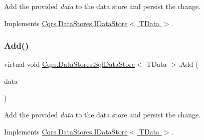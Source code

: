 Add the provided {\itshape data}  to the data store and persist the change. 



Implements \hyperlink{interfaceCqrs_1_1DataStores_1_1IDataStore_a114404daaf37fec9cc5547cd9a17858c_a114404daaf37fec9cc5547cd9a17858c}{Cqrs.\+Data\+Stores.\+I\+Data\+Store$<$ T\+Data $>$}.

\mbox{\label{classCqrs_1_1DataStores_1_1SqlDataStore_a45aa105f2571510223c6073804690487_a45aa105f2571510223c6073804690487}} 
\subsubsection{\texorpdfstring{Add()}{Add()}\hspace{0.1cm}{\footnotesize\ttfamily [2/2]}}
{\footnotesize\ttfamily virtual void \hyperlink{classCqrs_1_1DataStores_1_1SqlDataStore}{Cqrs.\+Data\+Stores.\+Sql\+Data\+Store}$<$ T\+Data $>$.Add (\begin{DoxyParamCaption}\item[{I\+Enumerable$<$ T\+Data $>$}]{data }\end{DoxyParamCaption})\hspace{0.3cm}{\ttfamily [virtual]}}



Add the provided {\itshape data}  to the data store and persist the change. 



Implements \hyperlink{interfaceCqrs_1_1DataStores_1_1IDataStore_a906f3f2f80db7a549a4170eca4653e26_a906f3f2f80db7a549a4170eca4653e26}{Cqrs.\+Data\+Stores.\+I\+Data\+Store$<$ T\+Data $>$}.

\mbox{\label{classCqrs_1_1DataStores_1_1SqlDataStore_a8458af970314deef8eff6a4783b1c46f_a8458af970314deef8eff6a4783b1c46f}} 
